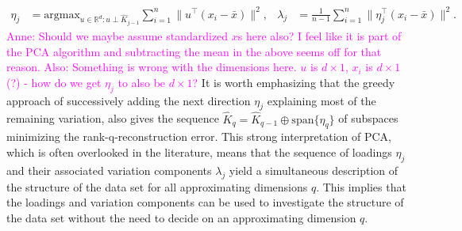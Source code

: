 \documentclass[titlepage,11pt,twoside]{article}
\newcommand{\hl}[1]{\textcolor{magenta}{#1}}
\newcommand{\RR}{\mathbb{R}}
\newcommand{\argmax}{\text{argmax}}
\begin{document}
\begin{align*}
\eta_j &= \argmax_{u \in \RR^d\colon u \perp \hat{K}_{j-1}} \sum_{i=1}^n \lVert u^\top (x_i - \bar{x}) \rVert^2, &
\lambda_j &= \frac{1}{n-1} \sum_{i=1}^n \lVert \eta_j^\top (x_i - \bar{x}) \rVert^2.
\end{align*}
\hl{Anne: Should we maybe assume standardized $x$s here also? I feel like it is part of the PCA algorithm and subtracting the mean in the above seems off for that reason. Also: Something is wrong with the dimensions here. $u$ is $d \times 1$, $x_i$ is $d \times 1$(?) - how do we get $\eta_j$ to also be $d \times 1$?} It is worth emphasizing that the greedy approach of successively adding the next direction $\eta_j$ explaining most of the remaining variation, also gives the sequence $\hat{K}_q = \hat{K}_{q-1} \oplus \text{span} \{\eta_q\}$ of subspaces minimizing the rank-q-reconstruction error. This strong interpretation of PCA, which is often overlooked in the literature, means that the sequence of loadings $\eta_j$ and their associated variation components $\lambda_j$ yield a simultaneous description of the structure of the data set for all approximating dimensions $q$. This implies that the loadings and variation components can be used to investigate the structure of the data set without the need to decide on an approximating dimension $q$.
\end{document}
